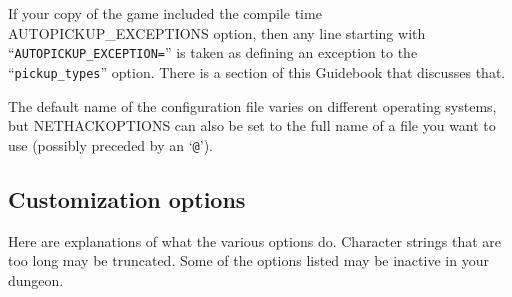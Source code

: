 If your copy of the game included the compile time AUTOPICKUP\_EXCEPTIONS 
option, then any line starting with ``{\tt AUTOPICKUP\_EXCEPTION=}'' 
is taken as defining an exception to the ``{\tt pickup\_types}'' option.
There is a section of this Guidebook that discusses that.

The default name of the configuration file varies on different
operating systems, but NETHACKOPTIONS can also be set to
the full name of a file you want to use (possibly preceded by an `{\tt @}').

\subsection*{Customization options}

Here are explanations of what the various options do.
Character strings that are too long may be truncated.
Some of the options listed may be inactive in your dungeon.


